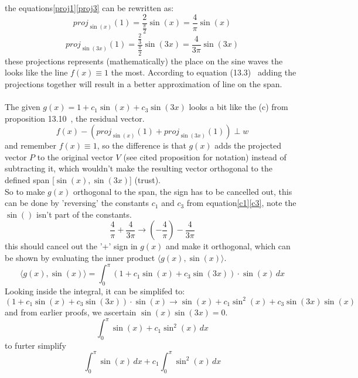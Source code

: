 \documentclass[12pt]{article}
\begin{document}
the equations\eqref{proj1}\eqref{proj3} can be rewritten as:
\begin{equation} \label{c1}
    proj_{\sin(x)}(1) = \frac{2}{\frac{\pi}{2}} \sin(x) = \frac{4}{\pi} \sin(x)
\end{equation}
 \begin{equation} \label{c3}
    proj_{\sin(3x)}(1) = \frac{\frac{2}{3}}{\frac{\pi}{2}} \sin(3x) = \frac{4}{3\pi} \sin(3x)
\end{equation}
these projections represents (mathematically) the place on the sine waves the looks like the line $f(x) \equiv 1$ the most. According to equation (13.3)~\cite{NUMLA} adding the projections together will
result in a better approximation of line on the span.\\\\

\noindent The given $g(x) = 1 + c_1 \sin(x) + c_3 \sin(3x)$ looks a bit like the (c) from proposition 13.10~\cite{NUMLA}, the residual vector.
\begin{equation}
    f(x) - ( proj_{\sin(x)}(1)+proj_{\sin(3x)}(1)) \perp w
\end{equation}
and remember $f(x) \equiv 1$, so the difference is that $g(x)$ adds the projected vector $P$ to the original vector $V$ (see cited proposition for notation) instead of subtracting it, which wouldn't make the resulting vector orthogonal to the defined span [$\sin(x),\sin(3x)$] (trust).\\
So to make $g(x)$ orthogonal to the span, the sign has to be cancelled out, this can be done by 'reversing' the constants $c_1$ and $c_3$ from equation\eqref{c1}\eqref{c3}, note the $\sin()$ isn't part of the constants.
\begin{equation} \label{reverse}
    \frac{4}{\pi} + \frac{4}{3\pi} \to (-\frac{4}{\pi}) - \frac{4}{3\pi}
\end{equation}
this should cancel out the '+' sign in $g(x)$ and make it orthogonal, which can be shown by evaluating the inner product $\langle g(x),\sin(x) \rangle$.
\begin{equation*}
    \langle g(x),\sin(x) \rangle = \int_{0}^{\pi} (1 + c_1\sin(x) + c_3\sin(3x)) \cdot \sin(x) \, dx
\end{equation*}
Looking inside the integral, it can be simplifed to:
\[
(1 + c_1\sin(x) + c_3\sin(3x)) \cdot \sin(x) \to \sin(x) + c_1 \sin^2(x) + c_3\sin(3x)\sin(x)
\]
and from earlier proofs, we ascertain $\sin(x)\sin(3x) = 0$.
\[
\int_{0}^{\pi} \sin(x) + c_1\sin^2(x) \, dx 
\]
to furter simplify
\[
\int_{0}^{\pi} \sin(x) \, dx + c_1 \int_{0}^{\pi} \sin^2(x) \, dx
\]
\end{document}
